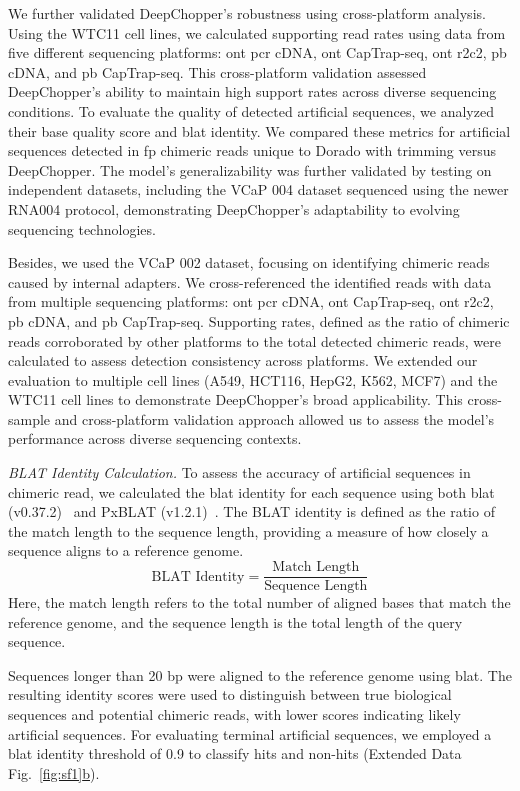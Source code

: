 \documentclass[pdflatex, sn-mathphys-num, lineno]{sn-jnl}%
\newcommand{\edfigref}[2]{Extended Data Fig.~\hyperref[#1]{\ref*{#1}#2}}
\theoremstyle{thmstyleone}%
\theoremstyle{thmstyletwo}%
\theoremstyle{thmstylethree}%
\begin{document}
We further validated DeepChopper's robustness using cross-platform analysis.
Using the WTC11 cell lines, we calculated supporting read rates using data from five different sequencing platforms: \gls{ont} \gls{pcr} cDNA, \gls{ont} CapTrap-seq, \gls{ont} \gls{r2c2}, \gls{pb} cDNA, and \gls{pb} CapTrap-seq.
This cross-platform validation assessed DeepChopper's ability to maintain high support rates across diverse sequencing conditions.
To evaluate the quality of detected artificial sequences, we analyzed their base quality score and \gls{blat} identity.
We compared these metrics for artificial sequences detected in \gls{fp} chimeric reads unique to Dorado with trimming versus DeepChopper.
The model's generalizability was further validated by testing on independent datasets, including the VCaP 004 dataset sequenced using the newer RNA004 protocol, demonstrating DeepChopper's adaptability to evolving sequencing technologies.

Besides, we used the VCaP 002 dataset, focusing on identifying chimeric reads caused by internal adapters.
We cross-referenced the identified reads with data from multiple sequencing platforms: \gls{ont} \gls{pcr} cDNA, \gls{ont} CapTrap-seq, \gls{ont} \gls{r2c2}, \gls{pb} cDNA, and \gls{pb} CapTrap-seq.
Supporting rates, defined as the ratio of chimeric reads corroborated by other platforms to the total detected chimeric reads, were calculated to assess detection consistency across platforms.
We extended our evaluation to multiple cell lines (A549, HCT116, HepG2, K562, MCF7) and the WTC11 cell lines to demonstrate DeepChopper's broad applicability.
This cross-sample and cross-platform validation approach allowed us to assess the model's performance across diverse sequencing contexts.

\textit{BLAT Identity Calculation.} To assess the accuracy of artificial sequences in chimeric read, we calculated the \gls{blat} identity for each sequence using both \gls{blat} (v0.37.2)~\cite{kent2002blat} and PxBLAT (v1.2.1)~\cite{li2024pxblat}.
The BLAT identity is defined as the ratio of the match length to the sequence length, providing a measure of how closely a sequence aligns to a reference genome.
\[
	\textrm{BLAT Identity} = \frac{\textrm{Match Length}}{\textrm{Sequence Length}}
\]
Here, the match length refers to the total number of aligned bases that match the reference genome, and the sequence length is the total length of the query sequence.

Sequences longer than 20 bp were aligned to the reference genome using \gls{blat}.
The resulting identity scores were used to distinguish between true biological sequences and potential chimeric reads, with lower scores indicating likely artificial sequences.
For evaluating terminal artificial sequences, we employed a \gls{blat} identity threshold of 0.9 to classify hits and non-hits (\edfigref{fig:sf1}{b}).
\end{document}
